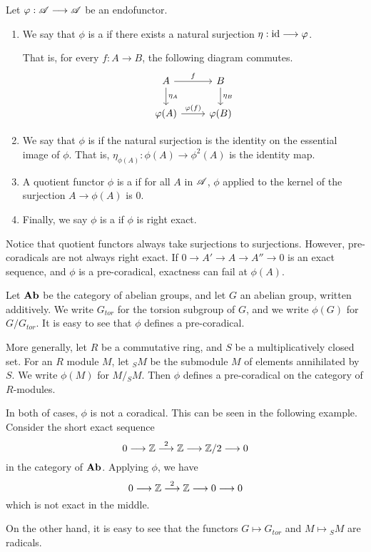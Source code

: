 \begin{defn}\label{def_coradical}
Let $\varphi: \mathscr{A} \longrightarrow \mathscr{A}$ be an endofunctor. 
\begin{enumerate}
\item We say that $\phi$ is a  if there 
exists a natural surjection $\eta: \mathrm{id} \longrightarrow \varphi$. 

That is, for every $f: A \to B$, the following diagram commutes.
\[
\begin{tikzcd}
A \arrow{r}{f} \arrow{d}{\eta_A} &
B \arrow{d}{\eta_B} \\
\phi(A) \arrow{r}{\phi(f)} 
&\phi(B)
\end{tikzcd}
\]

\item We say that $\phi$ is  if the natural 
surjection is the identity on the essential image of $\phi$.
That is, $\eta_{\phi(A)}: \phi(A) \to \phi^2(A)$ is the identity 
map.

\item A quotient functor $\phi$ is a  if for all
$A$ in $\mathscr{A}$, $\phi$ applied to the kernel of the surjection 
$A \to \phi(A)$ is $0$.

\item Finally, we say $\phi$ is a  if $\phi$ is
right exact.
\end{enumerate}
\end{defn}

\begin{rmk}
Notice that quotient functors always take surjections to 
surjections. However, pre-coradicals are not always right exact.
If $0 \to A' \to A \to A'' \to 0$ is an exact sequence, and $\phi$
is a pre-coradical, exactness can fail at $\phi(A)$.
\end{rmk}

\begin{ex}
Let $\mathbf{Ab}$ be the category of abelian groups, and let $G$ an
abelian group, written additively. We write $G_{tor}$ for the 
torsion subgroup of $G$, and we write $\phi(G)$ for $G/G_{tor}$.
It is easy to see that $\phi$ defines a pre-coradical.

More generally, let $R$ be a commutative ring, and $S$ be a 
multiplicatively closed set. For an $R$ module $M$, let ${}_SM$
be the submodule $M$ of elements annihilated by $S$. We write
$\phi(M)$ for $M/{}_SM$. Then $\phi$ defines a pre-coradical on
the category of $R$-modules.

In both of cases, $\phi$ is not a coradical. This can be seen in
the following example. Consider the short exact sequence
\[
0 \longrightarrow \mathbb{Z} \stackrel{2}{\longrightarrow} \mathbb{Z} \longrightarrow \mathbb{Z}/2 \longrightarrow 0
\]
in the category of $\mathbf{Ab}$. Applying $\phi$, we have
\[
0 \longrightarrow \mathbb{Z} \stackrel{2}{\longrightarrow} \mathbb{Z} \longrightarrow 0 \longrightarrow 0
\]
which is not exact in the middle.

On the other hand, it is easy to see that the functors $G \mapsto 
G_{tor}$ and $M \mapsto {}_SM$ are radicals.
\end{ex}

